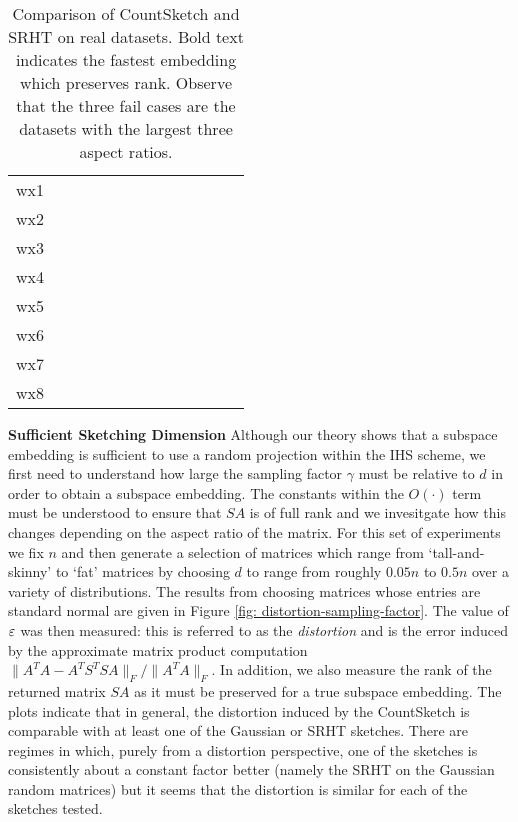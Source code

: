 \begin{table}[ht]
\begin{adjustbox}{width=1\textwidth}
\begin{tabular}{|c|c|c|c|c|c|c|c|c|c|c|c|c|}
wx1 & & & & & & & & & & & & \\

wx2 & & & & & & & & & & & & \\

wx3 & & & & & & & & & & & & \\

wx4 & & & & & & & & & & & & \\

wx5 & & & & & & & & & & & & \\

wx6 & & & & & & & & & & & & \\

wx7 & & & & & & & & & & & & \\

wx8 & & & & & & & & & & & & \\  
\hline
\end{tabular}
\end{adjustbox}
\caption{Comparison of CountSketch and SRHT on real datasets. Bold text indicates
the fastest embedding which preserves rank.
Observe that the three fail cases are the datasets  with the largest three
aspect ratios.}
\label{table: real-data-subspace-embedding}
\end{table}



\noindent\textbf{Sufficient Sketching Dimension}
Although our theory shows that a subspace embedding is sufficient to use a random
projection within the IHS scheme, we first need to understand how large the
sampling factor $\gamma$ must be relative to $d$ in order to obtain a subspace
embedding.
The constants within the $O(\cdot)$ term must be understood to ensure that $SA$
is of full rank and we invesitgate how this changes depending on the aspect
ratio of the matrix.
For this set of experiments we fix $n$ and then generate a selection of matrices
which range from `tall-and-skinny' to `fat' matrices by choosing $d$ to range
from roughly $0.05n$ to $0.5n$ over a variety of distributions.
The results from choosing matrices whose entries are standard normal are given
in Figure \ref{fig: distortion-sampling-factor}.
The value of $\varepsilon$ was then measured: this is referred to as the \textit{
distortion} and is the error induced by the approximate matrix product
computation $\|A^T A - A^T S^T S A \|_F/\|A^TA\|_F$.
In addition, we also measure the rank of the returned matrix $SA$ as it must
be preserved for a true subspace embedding.
The plots indicate that in general, the distortion induced by the CountSketch is
comparable with at least one of the Gaussian or SRHT sketches.
There are regimes in which, purely from a distortion perspective, one of the
sketches is consistently about a constant factor better (namely the SRHT on the
Gaussian random matrices) but it seems that the distortion is similar for each
of the sketches tested.

